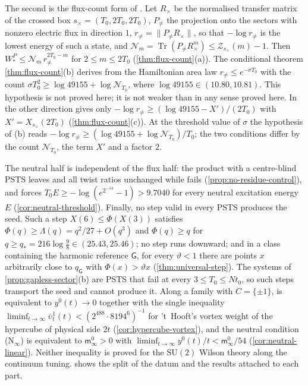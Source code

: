 \documentclass[11pt,a4paper]{amsart}
\theoremstyle{definition}
\theoremstyle{remark}
\numberwithin{equation}{section}
\DeclareMathOperator{\Tr}{Tr}        %
\newcommand{\norm}[1]{\lVert #1\rVert}     %
\newcommand{\SU}{\mathrm{SU}}              %
\newcommand{\PSTS}{\textup{PSTS}}          %
\newcommand{\TT}{\mathbb{T}}               %
\newcommand{\Zc}{\mathcal{Z}}              %
\newcommand{\Zs}[2]{\Zc_{#1}(#2)}          %
\newcommand{\XT}[2]{X_{#1}(#2)}            %
\newcommand{\Gharm}{\mathsf{G}}            %
\newcommand{\Mcirc}{\text{\upshape(M$^{\circ}$)}}   %
\newcommand{\Bcirc}{\text{\upshape(B$^{\circ}$)}}   %
\newcommand{\hypN}{\text{\upshape(N)}}              %
\newcommand{\hypP}{\text{\upshape(P)}}              %
\newcommand{\tzero}{t_0}                   %
\begin{document}
The second is the flux-count form of \hypP. Let $R_\times$ be the normalised transfer matrix of the crossed box $s_\times=(T_0,2T_0,2T_0)$, $P_{\ne}$ the projection onto the sectors with nonzero electric flux in direction $1$, $r_{\ne}=\norm{P_{\ne}R_\times}$, so that $-\log r_{\ne}$ is the lowest energy of such a state, and $\mathcal N_m=\Tr(P_{\ne}R_\times^m)\le\Zs{s_\times}{m}-1$. Then $W^P_*\le\mathcal N_m\,r_{\ne}^{2T_0-m}$ for $2\le m\le2T_0$ (\cref{thm:flux-count}(a)). The conditional theorem \cref{thm:flux-count}(b) derives \hypP{} from the Hamiltonian area law $r_{\ne}\le e^{-\sigma T_0}$ with the count $\sigma T_0^2\ge\log49155+\log\mathcal N_{T_0}$, where $\log49155\in(10.80,10.81)$. This hypothesis is not proved here; it is not weaker than \Mcirc{} in any sense proved here. In the other direction \hypP{} gives only $-\log r_{\ne}\ge(\log49155-X')/(2T_0)$ with $X'=\XT{s_\times}{2T_0}$ (\cref{thm:flux-count}(c)). At the threshold value of $\sigma$ the hypothesis of (b) reads $-\log r_{\ne}\ge(\log49155+\log\mathcal N_{T_0})/T_0$; the two conditions differ by the count $\mathcal N_{T_0}$, the term $X'$ and a factor $2$.

The neutral half is independent of the flux half: the product with a centre-blind \PSTS{} leaves \hypP{} and all twist ratios unchanged while \hypN{} fails (\cref{prop:no-residue-control}), and \hypN{} forces $T_0E\ge-\log(e^{2^{-14}}-1)>9.7040$ for every neutral excitation energy $E$ (\cref{cor:neutral-threshold}). Finally, no step valid in every \PSTS{} produces the seed. Such a step $X(6)\le\Phi(X(3))$ satisfies $\Phi(q)\ge\Lambda(q)=q^2/27+O(q^3)$ and $\Phi(q)\ge q$ for $q\ge q_*=216\log\frac98\in(25.43,25.46)$; no step runs downward; and in a class containing the harmonic reference $\Gharm$, for every $\vartheta<1$ there are points $x$ arbitrarily close to $q_\Gharm$ with $\Phi(x)>\vartheta x$ (\cref{thm:universal-step}). The systems of \cref{prop:gapless-sector}(b) are \PSTS{} that fail \Bcirc{} at every $3\le T_0\le N\tzero$, so such steps transport the seed and cannot produce it. Along a family with $C=\{\pm1\}$, \Mcirc{} is equivalent to $y^0(t)\to0$ together with the single inequality $\liminf_{t\to\infty}\bar\upsilon^1_t(t)<(2^{488}\cdot8194^6)^{-1}$ for 't~Hooft's vortex weight of the hypercube of physical side $2t$ (\cref{cor:hypercube-vortex}), and the neutral condition \textup{(N$_\infty$)} is equivalent to $\mathsf m^0_\infty>0$ with $\liminf_{t\to\infty}y^0(t)/t<\mathsf m^0_\infty/54$ (\cref{cor:neutral-linear}). Neither inequality is proved for the $\SU(2)$ Wilson theory along the continuum tuning.  shows the split of the datum and the results attached to each part.
\end{document}
